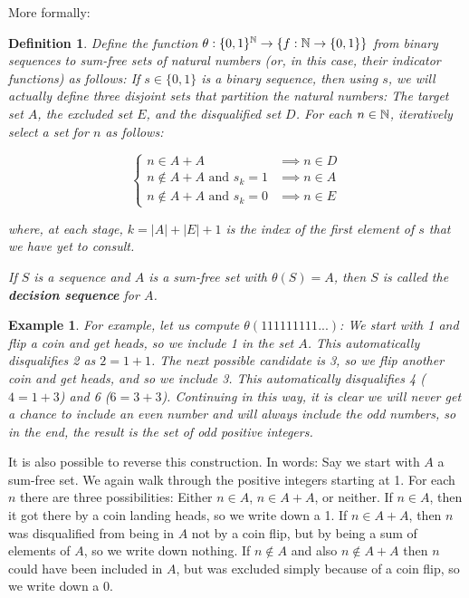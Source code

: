 \documentclass{report}
\newtheorem{definition}[theorem]{Definition}
\newtheorem{example}{Example}
\theoremstyle{remark}
\numberwithin{equation}{section}
\begin{document}
More formally: 

\begin{definition}Define the function
  $\theta : \{0,1\}^{\mathbb{N}} \to \{f : \mathbb{N} \to \{0,1\}\}$ from binary
  sequences to sum-free sets of natural numbers (or, in this case,
  their indicator functions) as follows: If $s\in\{0,1\}$ is a binary
  sequence, then using $s$, we will actually define three disjoint
  sets that partition the natural numbers: The target set $A$, the
  excluded set $E$, and the disqualified set $D$.  For each
  $n \in \mathbb{N}$, iteratively select a set for $n$ as follows:

\[\begin{cases}
n \in A+A &\implies n \in D\\
n \notin A+A \text{ and } s_k = 1 &\implies n \in A\\
n \notin A+A \text{ and } s_k = 0 &\implies n \in E
\end{cases}\]

where, at each stage, $k = |A|+|E|+1$ is the index of the first
element of $s$ that we have yet to consult. 

If $S$ is a sequence and $A$ is a sum-free set with $\theta(S) = A$,
then $S$ is called the \textbf{decision sequence} for $A$.
\end{definition}

\begin{example}
  For example, let us compute $\theta(111111111...)$: We start with 1
  and flip a coin and get heads, so we include 1 in the set $A$.  This
  automatically disqualifies 2 as $2 = 1+1$.  The next possible
  candidate is 3, so we flip another coin and get heads, and so we
  include 3.  This automatically disqualifies 4 ($4 = 1+3$) and 6
  ($6 = 3+3$).  Continuing in this way, it is clear we will never get
  a chance to include an even number and will always include the odd
  numbers, so in the end, the result is the set of odd positive
  integers.
\end{example}

It is also possible to reverse this construction.  In words: Say we
start with $A$ a sum-free set.  We again walk through the positive
integers starting at 1.  For each $n$ there are three possibilities:
Either $n \in A$, $n \in A+A$, or neither.  If $n \in A$, then it got
there by a coin landing heads, so we write down a 1.  If $n \in A+A$,
then $n$ was disqualified from being in $A$ not by a coin flip, but by
being a sum of elements of $A$, so we write down nothing.  If $n
\notin A$ and also $n \notin A+A$ then $n$ could have been included in
$A$, but was excluded simply because of a coin flip, so we write down
a 0.  
\end{document}
